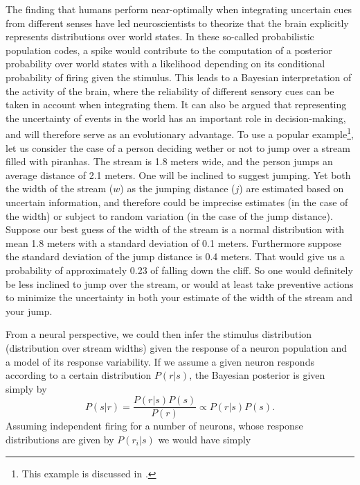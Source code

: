 \par
The finding that humans perform near-optimally when integrating uncertain cues from different senses have led neuroscientists to theorize that the brain explicitly represents distributions over world states\cite{Ernst2002,Ma2006}. In these so-called probabilistic population codes, a spike would contribute to the computation of a posterior probability over world states with a likelihood depending on its conditional probability of firing given the stimulus. This leads to a Bayesian interpretation of the activity of the brain, where the reliability of different sensory cues can be taken in account when integrating them. It can also be argued that representing the uncertainty of events in the world has an important role in decision-making, and will therefore serve as an evolutionary advantage. To use a popular example\footnote{This example is discussed in \citep{Ma2006}.}, let us consider the case of a person deciding wether or not to jump over a stream filled with piranhas. The stream is 1.8 meters wide, and the person jumps an average distance of 2.1 meters. One will be inclined to suggest jumping. Yet both the width of the stream ($w$) as the jumping distance ($j$) are estimated based on uncertain information, and therefore could be imprecise estimates (in the case of the width) or subject to random variation (in the case of the jump distance). Suppose our best guess of the width of the stream is a normal distribution with mean 1.8 meters with a standard deviation of 0.1 meters. Furthermore suppose the standard deviation of the jump distance is 0.4 meters. That would give us a probability of approximately 0.23 of falling down the cliff. So one would definitely be less inclined to jump over the stream, or would at least take preventive actions to minimize the uncertainty in both your estimate of the width of the stream and your jump.\par
From a neural perspective, we could then infer the stimulus distribution (distribution over stream widths) given the response of a neuron population and a model of its response variability. If we assume a given neuron responds according to a certain distribution $P(r|s)$, the Bayesian posterior is given simply by
\[
P(s|r) = \frac{P(r|s) P(s)}{P(r)} \propto P(r|s) P(s).
\]
Assuming independent firing for a number of neurons, whose response distributions are given by $P(r_i|s)$ we would have simply
